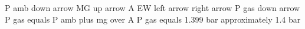 P amb down arrow MG up arrow A
EW left arrow right arrow
P gas down arrow
P gas equals P amb plus mg over A
P gas equals 1.399 bar approximately 1.4 bar